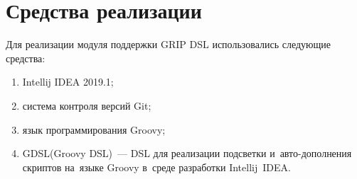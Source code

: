 \section{Средства реализации} \label{sub22}

Для реализации модуля поддержки GRIP DSL использовались следующие средства:

\begin{enumerate} 
\item{Intellij IDEA 2019.1;}	
\item{система контроля версий Git;}
\item{язык программирования Groovy;}
\item{GDSL(Groovy DSL)~--- DSL для реализации подсветки и~авто-дополнения скриптов на~языке Groovy в~среде разработки Intellij~IDEA.}
\end{enumerate}
